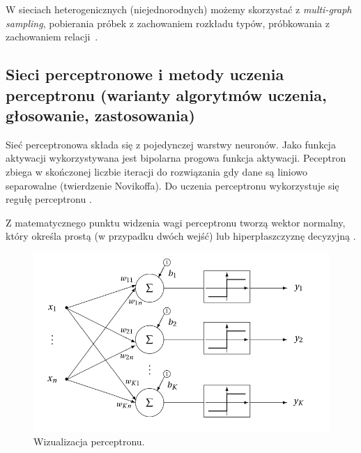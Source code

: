 \documentclass[wi]{zut}
\begin{document}
W sieciach heterogenicznych (niejednorodnych) możemy skorzystać z \emph{multi-graph sampling}, pobierania próbek z zachowaniem rozkładu typów, próbkowania z zachowaniem relacji~\cite{Jankowski2020_probkowanie}.




\subsection{Sieci perceptronowe i metody uczenia perceptronu (warianty algorytmów uczenia, głosowanie, zastosowania)}

Sieć perceptronowa składa się z pojedynczej warstwy neuronów. Jako funkcja aktywacji wykorzystywana jest bipolarna progowa funkcja aktywacji. Peceptron zbiega w skończonej liczbie iteracji do rozwiązania gdy dane są liniowo separowalne (twierdzenie Novikoffa). Do uczenia perceptronu wykorzystuje się regułę perceptronu \cite{Korzen2020_8}.

 Z matematycznego punktu widzenia wagi perceptronu tworzą wektor normalny, który określa prostą (w przypadku dwóch wejść) lub hiperpłaszczyznę decyzyjną \cite{wiki:Perceptron}.

\begin{figure}[H]
    \centering
    \includegraphics[width=0.5\linewidth]{images/perceptron.png}
    \caption{Wizualizacja perceptronu.}
    \label{fig:apriori}
\end{figure}
\end{document}
